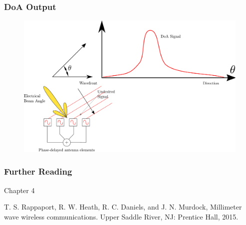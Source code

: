\documentclass[10pt]{beamer}
\begin{document}
\begin{frame}
    \frametitle{DoA Output}

    \begin{figure}[h!]
        \centering
        \includegraphics[width=.7\textwidth]{DoA.pdf}
    \end{figure}
\end{frame}

\begin{frame}
    \frametitle{Further Reading}
    
    Chapter 4 

    T. S. Rappaport, R. W. Heath, R. C. Daniels, and J. N. Murdock, Millimeter wave wireless communications. Upper Saddle River, NJ: Prentice Hall, 2015.

\end{frame}
\end{document}
